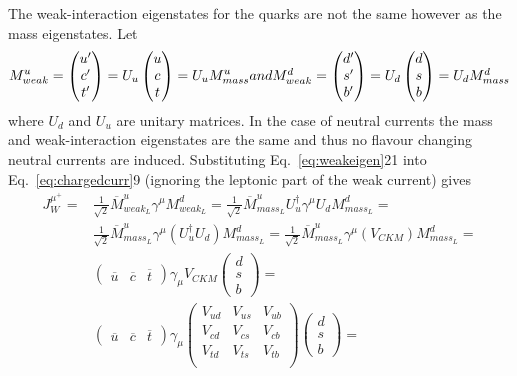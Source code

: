 The weak-interaction eigenstates for the quarks are not the same however as the mass eigenstates. Let
\begin{equation}
  M_{weak}^{u} = \begin{pmatrix}u^{\prime}\\c^{\prime} \\t^{\prime}\end{pmatrix} = U_{u}\begin{pmatrix}u\\c\\t\end{pmatrix}  = U_{u}M_{mass}^{u}$$and$$ M_{weak}^{d} = \begin{pmatrix}d^{\prime}\\s^{\prime} \\b^{\prime}\end{pmatrix} = U_{d}\begin{pmatrix}d\\s\\b\end{pmatrix} = U_{d}M_{mass}^{d}
      \label{eq:weakeigen}
\end{equation}
where $U_{d}$ and $U_{u}$ are unitary matrices.
In the case of neutral currents the mass and weak-interaction eigenstates are the same and thus no flavour changing neutral currents are induced. Substituting Eq.~\ref{eq:weakeigen}{21} into Eq.~\ref{eq:chargedcurr}{9} (ignoring the leptonic part of the weak current) gives
\begin{equation}
  \begin{split}
    J_{W}^{\mu^{+}} =
    &\frac{1}{\sqrt{2}}\overline{M}_{weak_{L}}^{u}\gamma^{\mu}M_{weak_{L}}^{d} = \frac{1}{\sqrt{2}}\overline{M}_{mass_{L}}^{u}U_{u}^{\dagger}\gamma^{\mu}U_{d}M_{mass_{L}}^{d} = \\
    & \frac{1}{\sqrt{2}}\overline{M}_{mass_{L}}^{u}\gamma^{\mu}(U_{u}^{\dagger}U_{d})M_{mass_{L}}^{d} = \frac{1}{\sqrt{2}}\overline{M}_{mass_{L}}^{u}\gamma^{\mu}(V_{CKM})M_{mass_{L}}^{d}  = \\
    &\begin{pmatrix}\overline{u}&\overline{c}&\overline{t}\end{pmatrix}\gamma_{\mu}V_{CKM}\begin{pmatrix}d\\s\\b\end{pmatrix} = \\
      &\begin{pmatrix}\overline{u}&\overline{c}&\overline{t}\end{pmatrix}\gamma_{\mu}\begin{pmatrix}V_{ud}&V_{us}&V_{ub}\\V_{cd}&V_{cs}&V_{cb}\\V_{td}&V_{ts}&V_{tb}\\\end{pmatrix} \begin{pmatrix}  d\\s\\b\end{pmatrix} = \\
  \end{split}
\end{equation}
